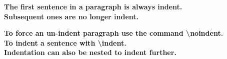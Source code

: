 \documentclass[12pt, a4paper]{article}
\begin{document}
\textbf{The first sentence in a paragraph is always indent.} \blindtext \\
\textbf{Subsequent ones are no longer indent.} \blindtext

\noindent \textbf{To force an un-indent paragraph use the command \textbackslash noindent.} \blindtext \\
\indent \textbf{To indent a sentence with \textbackslash indent.} \\
\indent\indent \textbf{Indentation can also be nested to indent further.}
\end{document}
